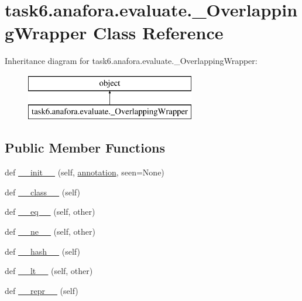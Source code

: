\hypertarget{classtask6_1_1anafora_1_1evaluate_1_1__OverlappingWrapper}{}\section{task6.\+anafora.\+evaluate.\+\_\+\+Overlapping\+Wrapper Class Reference}
\label{classtask6_1_1anafora_1_1evaluate_1_1__OverlappingWrapper}
Inheritance diagram for task6.\+anafora.\+evaluate.\+\_\+\+Overlapping\+Wrapper\+:\begin{figure}[H]
\begin{center}
\leavevmode
\includegraphics[height=2.000000cm]{classtask6_1_1anafora_1_1evaluate_1_1__OverlappingWrapper}
\end{center}
\end{figure}
\subsection*{Public Member Functions}
\begin{DoxyCompactItemize}
\item 
def \hyperlink{classtask6_1_1anafora_1_1evaluate_1_1__OverlappingWrapper_a7a77c186e65867fd0388981131701f97}{\+\_\+\+\_\+init\+\_\+\+\_\+} (self, \hyperlink{classtask6_1_1anafora_1_1evaluate_1_1__OverlappingWrapper_a40a5e4b7276214d3f41ae0bf14f5ce4a}{annotation}, seen=None)
\item 
def \hyperlink{classtask6_1_1anafora_1_1evaluate_1_1__OverlappingWrapper_a0f5cdb7222bb67eaa443f35c4ac77203}{\+\_\+\+\_\+class\+\_\+\+\_\+} (self)
\item 
def \hyperlink{classtask6_1_1anafora_1_1evaluate_1_1__OverlappingWrapper_a50d965f4b4aa9e34d760f8bb9d5c70f8}{\+\_\+\+\_\+eq\+\_\+\+\_\+} (self, other)
\item 
def \hyperlink{classtask6_1_1anafora_1_1evaluate_1_1__OverlappingWrapper_a5e4b83ad14e08734d255b4c2e40d7b12}{\+\_\+\+\_\+ne\+\_\+\+\_\+} (self, other)
\item 
def \hyperlink{classtask6_1_1anafora_1_1evaluate_1_1__OverlappingWrapper_a3b264301572d92e1cbf9e47f879ce90d}{\+\_\+\+\_\+hash\+\_\+\+\_\+} (self)
\item 
def \hyperlink{classtask6_1_1anafora_1_1evaluate_1_1__OverlappingWrapper_adcdfe31ff47beed18c0c9193344d96a5}{\+\_\+\+\_\+lt\+\_\+\+\_\+} (self, other)
\item 
def \hyperlink{classtask6_1_1anafora_1_1evaluate_1_1__OverlappingWrapper_a9cdc9b06aea554182e7b255237393457}{\+\_\+\+\_\+repr\+\_\+\+\_\+} (self)
\end{DoxyCompactItemize}
